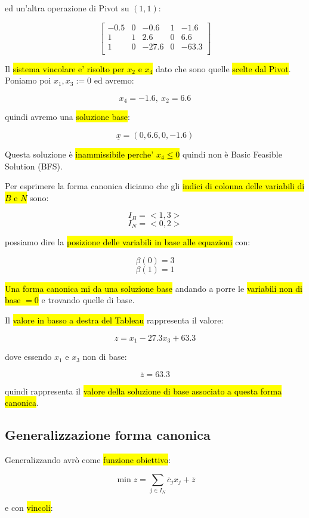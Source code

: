 ed un'altra operazione di Pivot su $(1, 1)$:


$$
\left[ {\begin{array}{ccccc}
	-0.5 & 0 & -0.6   & 1 & -1.6\\
	1  	 & 1 & 2.6    & 0 &  6.6\\
	1    & 0 & -27.6  & 0 & -63.3\\
\end{array} } \right]
$$


Il \hl{sistema vincolare e' risolto per $x_2$ e $x_4$} dato che sono quelle \hl{scelte dal Pivot}. Poniamo poi $x_1, x_3 := 0$ ed avremo:

$$x_4 = -1.6,\ x_2 = 6.6$$

quindi avremo una \hl{soluzione base}:

$$\underline{x} = (0, 6.6, 0, -1.6)$$

Questa soluzione è \hl{inammissibile perche' $x_4 \leq 0$} quindi non è Basic Feasible Solution (BFS).

Per esprimere la forma canonica diciamo che gli \hl{indici di colonna delle variabili di $B$ e $N$} sono:

$$I_B = <1, 3>$$
$$I_N= <0, 2>$$

possiamo dire la \hl{posizione delle variabili in base alle equazioni} con:

$$\beta(0) = 3$$
$$\beta(1) = 1$$

\hl{Una forma canonica mi da una soluzione base} andando a porre le \hl{variabili non di base $= 0$} e trovando quelle di base.

Il \hl{valore in basso a destra del Tableau} rappresenta il valore:

$$z = x_1 -27.3x_3 + 63.3$$

dove essendo $x_1$ e $x_3$ non di base:

$$\overline{z} = 63.3$$

quindi rappresenta il \hl{valore della soluzione di base associato a questa forma canonica}.


\subsection{Generalizzazione forma canonica}

Generalizzando avrò come \hl{funzione obiettivo}:

$$\min z = \sum_{j \in  I_N} \overline{c}_jx_j + \overline{z}$$

e con \hl{vincoli}:

